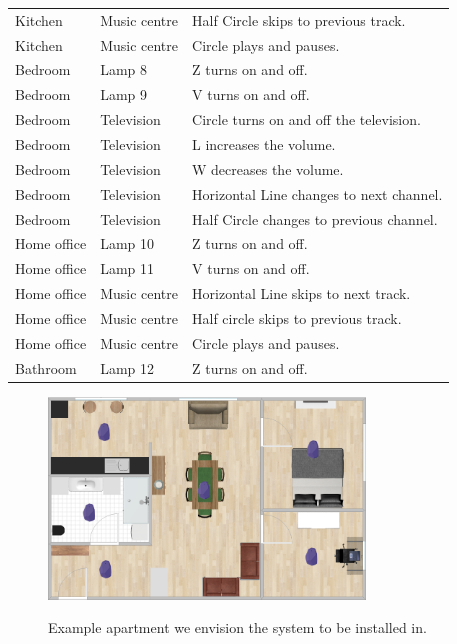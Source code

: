 \begin{table}[]
\begin{tabular}{lll}
Kitchen                    & Music centre                        & Half Circle skips to previous track.     \\
Kitchen                    & Music centre                        & Circle plays and pauses.                 \\
Bedroom                    & Lamp 8                              & Z turns on and off.                      \\
Bedroom                    & Lamp 9                              & V turns on and off.                      \\
Bedroom                    & Television                          & Circle turns on and off the television.  \\
Bedroom                    & Television                          & L increases the volume.                  \\
Bedroom                    & Television                          & W decreases the volume.                  \\
Bedroom                    & Television                          & Horizontal Line changes to next channel. \\
Bedroom                    & Television                          & Half Circle changes to previous channel. \\
Home office                & Lamp 10                             & Z turns on and off.                      \\
Home office                & Lamp 11                             & V turns on and off.                      \\
Home office                & Music centre                        & Horizontal Line skips to next track.     \\
Home office                & Music centre                        & Half circle skips to previous track.     \\
Home office                & Music centre                        & Circle plays and pauses.                 \\
Bathroom                   & Lamp 12                             & Z turns on and off.                     
\end{tabular}
\end{table}

\begin{figure}[h!]
\centering
\includegraphics[width=0.75\textwidth]{images/room-with-beacons}
\label{fig:analysis:scenario:apartment}
\caption{Example apartment we envision the system to be installed in.}
\end{figure}

